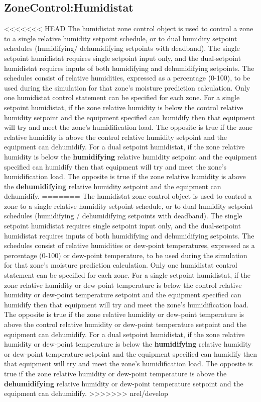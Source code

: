 \subsection{ZoneControl:Humidistat}\label{zonecontrolhumidistat}

<<<<<<< HEAD
The humidistat zone control object is used to control a zone to a single relative humidity setpoint schedule, or to dual humidity setpoint schedules (humidifying/ dehumidifying setpoints with deadband). The single setpoint humidistat requires single setpoint input only, and the dual-setpoint humidistat requires inputs of both humidifying and dehumidifying setpoints. The schedules consist of relative humidities, expressed as a percentage (0-100), to be used during the simulation for that zone's moisture prediction calculation. Only one humidistat control statement can be specified for each zone. For a single setpoint humidistat, if the zone relative humidity is below the control relative humidity setpoint and the equipment specified can humidify then that equipment will try and meet the zone's humidification load. The opposite is true if the zone relative humidity is above the control relative humidity setpoint and the equipment can dehumidify. For a dual setpoint humidistat, if the zone relative humidity is below the \textbf{humidifying} relative humidity setpoint and the equipment specified can humidify then that equipment will try and meet the zone's humidification load. The opposite is true if the zone relative humidity is above the \textbf{dehumidifying} relative humidity setpoint and the equipment can dehumidify.
=======
The humidistat zone control object is used to control a zone to a single relative humidity setpoint schedule, or to dual humidity setpoint schedules (humidifying / dehumidifying setpoints with deadband). The single setpoint humidistat requires single setpoint input only, and the dual-setpoint humidistat requires inputs of both humidifying and dehumidifying setpoints. The schedules consist of relative humidities or dew-point temperatures, expressed as a percentage (0-100) or dew-point temperature, to be used during the simulation for that zone's moisture prediction calculation. Only one humidistat control statement can be specified for each zone. For a single setpoint humidistat, if the zone relative humidity or dew-point temperature is below the control relative humidity or dew-point temperature setpoint and the equipment specified can humidify then that equipment will try and meet the zone's humidification load. The opposite is true if the zone relative humidity or dew-point temperature is above the control relative humidity or dew-point temperature setpoint and the equipment can dehumidify. For a dual setpoint humidistat, if the zone relative humidity or dew-point temperature is below the \textbf{humidifying} relative humidity or dew-point temperature setpoint and the equipment specified can humidify then that equipment will try and meet the zone's humidification load. The opposite is true if the zone relative humidity or dew-point temperature is above the \textbf{dehumidifying} relative humidity or dew-point temperature setpoint and the equipment can dehumidify.
>>>>>>> nrel/develop

